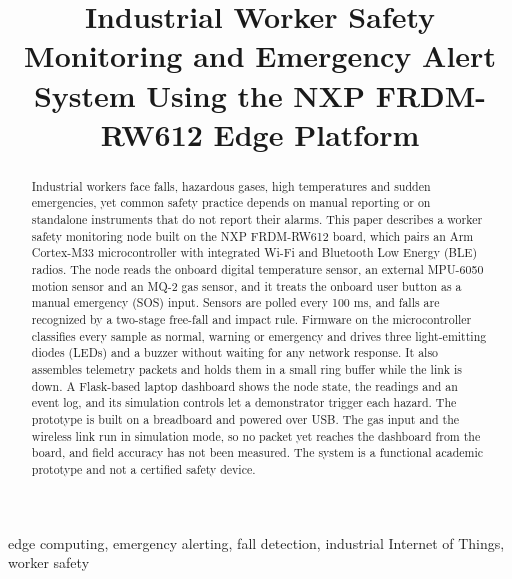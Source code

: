 \documentclass[conference]{IEEEtran}
\begin{document}
\title{Industrial Worker Safety Monitoring and Emergency Alert System Using the NXP FRDM-RW612 Edge Platform}

\author{
}

\maketitle

\begin{abstract}
Industrial workers face falls, hazardous gases, high temperatures and sudden emergencies, yet common safety practice depends on manual reporting or on standalone instruments that do not report their alarms. This paper describes a worker safety monitoring node built on the NXP FRDM-RW612 board, which pairs an Arm Cortex-M33 microcontroller with integrated Wi-Fi and Bluetooth Low Energy (BLE) radios. The node reads the onboard digital temperature sensor, an external MPU-6050 motion sensor and an MQ-2 gas sensor, and it treats the onboard user button as a manual emergency (SOS) input. Sensors are polled every 100 ms, and falls are recognized by a two-stage free-fall and impact rule. Firmware on the microcontroller classifies every sample as normal, warning or emergency and drives three light-emitting diodes (LEDs) and a buzzer without waiting for any network response. It also assembles telemetry packets and holds them in a small ring buffer while the link is down. A Flask-based laptop dashboard shows the node state, the readings and an event log, and its simulation controls let a demonstrator trigger each hazard. The prototype is built on a breadboard and powered over USB. The gas input and the wireless link run in simulation mode, so no packet yet reaches the dashboard from the board, and field accuracy has not been measured. The system is a functional academic prototype and not a certified safety device.
\end{abstract}

\begin{IEEEkeywords}
edge computing, emergency alerting, fall detection, industrial Internet of Things, worker safety
\end{IEEEkeywords}
\end{document}
